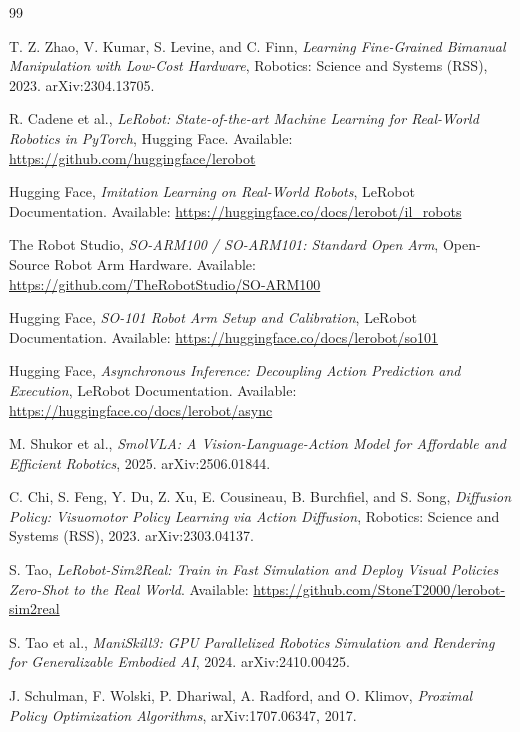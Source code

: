 \documentclass[titlepage]{pnureport}
\begin{document}
\begin{thebibliography}{99}

T. Z. Zhao, V. Kumar, S. Levine, and C. Finn,
\textit{Learning Fine-Grained Bimanual Manipulation with Low-Cost Hardware}, Robotics: Science and Systems (RSS), 2023. arXiv:2304.13705.

R. Cadene et al.,
\textit{LeRobot: State-of-the-art Machine Learning for Real-World Robotics in PyTorch}, Hugging Face.
Available: \url{https://github.com/huggingface/lerobot}

Hugging Face,
\textit{Imitation Learning on Real-World Robots}, LeRobot Documentation.
Available: \url{https://huggingface.co/docs/lerobot/il_robots}

The Robot Studio,
\textit{SO-ARM100 / SO-ARM101: Standard Open Arm}, Open-Source Robot Arm Hardware.
Available: \url{https://github.com/TheRobotStudio/SO-ARM100}

Hugging Face,
\textit{SO-101 Robot Arm Setup and Calibration}, LeRobot Documentation.
Available: \url{https://huggingface.co/docs/lerobot/so101}

Hugging Face,
\textit{Asynchronous Inference: Decoupling Action Prediction and Execution}, LeRobot Documentation.
Available: \url{https://huggingface.co/docs/lerobot/async}

M. Shukor et al.,
\textit{SmolVLA: A Vision-Language-Action Model for Affordable and Efficient Robotics}, 2025. arXiv:2506.01844.

C. Chi, S. Feng, Y. Du, Z. Xu, E. Cousineau, B. Burchfiel, and S. Song,
\textit{Diffusion Policy: Visuomotor Policy Learning via Action Diffusion}, Robotics: Science and Systems (RSS), 2023. arXiv:2303.04137.

S. Tao,
\textit{LeRobot-Sim2Real: Train in Fast Simulation and Deploy Visual Policies Zero-Shot to the Real World}.
Available: \url{https://github.com/StoneT2000/lerobot-sim2real}

S. Tao et al.,
\textit{ManiSkill3: GPU Parallelized Robotics Simulation and Rendering for Generalizable Embodied AI}, 2024. arXiv:2410.00425.

J. Schulman, F. Wolski, P. Dhariwal, A. Radford, and O. Klimov,
\textit{Proximal Policy Optimization Algorithms}, arXiv:1707.06347, 2017.


\end{thebibliography}
\end{document}
